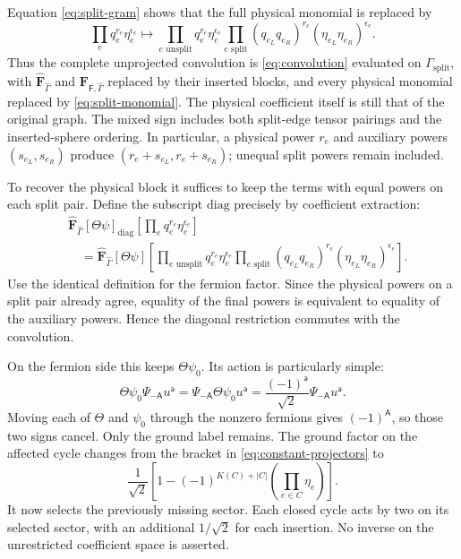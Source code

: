 \documentclass[11pt]{article}
\newcommand{\F}{\mathsf F}
\numberwithin{equation}{section}
\begin{document}
Equation \eqref{eq:split-gram} shows that the full physical monomial is
replaced by
\begin{equation}
 \prod_e q_e^{r_e}\eta_e^{\epsilon_e}
 \longmapsto
 \prod_{e\text{ unsplit}}q_e^{r_e}\eta_e^{\epsilon_e}
 \prod_{e\text{ split}}
       (q_{e_L}q_{e_R})^{r_e}(\eta_{e_L}\eta_{e_R})^{\epsilon_e}.
 \label{eq:split-monomial}
\end{equation}
Thus the complete unprojected convolution is
\eqref{eq:convolution} evaluated on $\Gamma_{\mathrm{split}}$, with
$\widehat{\mathbf F}_{\hat\Gamma}$ and
$\mathbf F_{\F,\hat\Gamma}$ replaced by their inserted blocks, and
every physical monomial replaced by \eqref{eq:split-monomial}. The
physical coefficient itself is still that of the original graph.
The mixed sign includes both split-edge tensor pairings and the
inserted-sphere ordering. In particular, a physical power
$r_e$ and auxiliary powers $(s_{e_L},s_{e_R})$ produce
$(r_e+s_{e_L},r_e+s_{e_R})$; unequal split powers remain included.

To recover the physical block it suffices to keep the terms with equal
powers on each split pair. Define the subscript $\mathrm{diag}$ precisely
by coefficient extraction:
\begin{align}
 &\widehat{\mathbf F}_{\hat\Gamma}[\Theta\psi]_{\mathrm{diag}}
                  \left[\prod_e q_e^{r_e}\eta_e^{\epsilon_e}\right]
 \nonumber\\
 &\quad=\widehat{\mathbf F}_{\hat\Gamma}[\Theta\psi]
 \left[\prod_{e\text{ unsplit}}q_e^{r_e}\eta_e^{\epsilon_e}
       \prod_{e\text{ split}}
          (q_{e_L}q_{e_R})^{r_e}(\eta_{e_L}\eta_{e_R})^{\epsilon_e}
 \right].
 \label{eq:diagonal-definition}
\end{align}
Use the identical definition for the fermion factor. Since the physical
powers on a split pair already agree, equality of the final powers is
equivalent to equality of the auxiliary powers. Hence the diagonal
restriction commutes with the convolution.

On the fermion side this keeps $\Theta\psi_0$. Its action is particularly
simple:
\begin{equation}
 \Theta\psi_0\Psi_{-\mathsf A}u^{\mathsf a}
   =\Psi_{-\mathsf A}\Theta\psi_0u^{\mathsf a}
   =\frac{(-1)^{\mathsf a}}{\sqrt2}\Psi_{-\mathsf A}u^{\mathsf a}.
 \label{eq:zero-mode}
\end{equation}
Moving each of $\Theta$ and $\psi_0$ through the nonzero fermions gives
$(-1)^{\mathsf A}$, so those two signs cancel. Only the ground label
remains. The ground factor on the affected cycle changes from the bracket
in \eqref{eq:constant-projectors} to
\begin{equation}
 \frac1{\sqrt2}
 \left[1-(-1)^{K(C)+|C|}
              \left(\prod_{e\in C}\eta_e\right)\right].
 \label{eq:inserted-ground}
\end{equation}
It now selects the previously missing sector. Each closed cycle acts by
two on its selected sector, with an additional $1/\sqrt2$ for each
insertion. No inverse on the unrestricted coefficient space is asserted.
\end{document}
